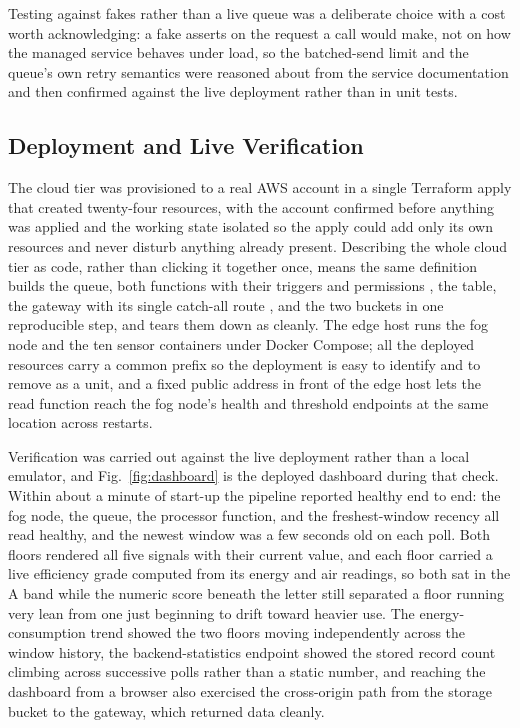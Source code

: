 \documentclass[conference]{IEEEtran}
\begin{document}
Testing against fakes rather than a live queue was a deliberate choice with a cost worth acknowledging: a fake asserts on the request a call would make, not on how the managed service behaves under load, so the batched-send limit and the queue's own retry semantics were reasoned about from the service documentation \cite{awssqs} and then confirmed against the live deployment rather than in unit tests.

\subsection{Deployment and Live Verification}

The cloud tier was provisioned to a real AWS account in a single Terraform apply that created twenty-four resources, with the account confirmed before anything was applied and the working state isolated so the apply could add only its own resources and never disturb anything already present. Describing the whole cloud tier as code, rather than clicking it together once, means the same definition builds the queue, both functions with their triggers and permissions \cite{awslambda}, the table, the gateway with its single catch-all route \cite{awsapigw}, and the two buckets in one reproducible step, and tears them down as cleanly. The edge host runs the fog node and the ten sensor containers under Docker Compose; all the deployed resources carry a common prefix so the deployment is easy to identify and to remove as a unit, and a fixed public address in front of the edge host lets the read function reach the fog node's health and threshold endpoints at the same location across restarts.

Verification was carried out against the live deployment rather than a local emulator, and Fig.~\ref{fig:dashboard} is the deployed dashboard during that check. Within about a minute of start-up the pipeline reported healthy end to end: the fog node, the queue, the processor function, and the freshest-window recency all read healthy, and the newest window was a few seconds old on each poll. Both floors rendered all five signals with their current value, and each floor carried a live efficiency grade computed from its energy and air readings, so both sat in the A band while the numeric score beneath the letter still separated a floor running very lean from one just beginning to drift toward heavier use. The energy-consumption trend showed the two floors moving independently across the window history, the backend-statistics endpoint showed the stored record count climbing across successive polls rather than a static number, and reaching the dashboard from a browser also exercised the cross-origin path from the storage bucket to the gateway, which returned data cleanly.
\end{document}
